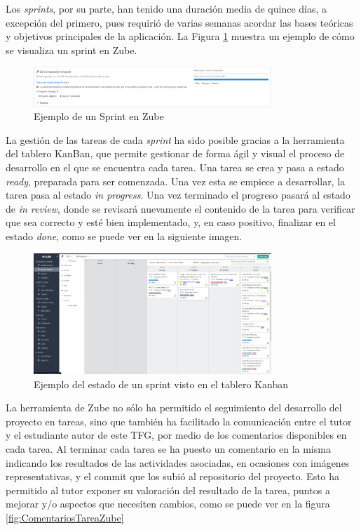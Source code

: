  Los \textit{sprints}, por su parte, han tenido una duración media de quince días, a excepción del primero, pues requirió de varias semanas acordar las bases teóricas y objetivos principales de la aplicación. La Figura \ref{fig:Sprint2} muestra un ejemplo de cómo se visualiza un sprint en Zube.

\begin{figure}[H]
\centering
\includegraphics[width=0.8\textwidth]{img/Sprint2.png}
\caption{Ejemplo de un Sprint en Zube}
\label{fig:Sprint2}
\end{figure}

La gestión de las tareas de cada \textit{sprint} ha sido posible gracias a la herramienta del tablero KanBan, que permite gestionar de forma ágil y visual el proceso de desarrollo en el que se encuentra cada tarea. Una tarea se crea y pasa a estado \textit{ready}, preparada para ser comenzada. Una vez esta se empiece a desarrollar, la tarea pasa al estado \textit{in progress}. Una vez terminado el progreso pasará al estado de \textit{in review}, donde se revisará nuevamente el contenido de la tarea para verificar que sea correcto y esté bien implementado, y, en caso positivo, finalizar en el estado \textit{done}, como se puede ver en la siguiente imagen.

\begin{figure}[H]
\centering
\includegraphics[width=0.8\textwidth]{img/4.1 IteracionZube.png}
\caption{Ejemplo del estado de un sprint visto en el tablero Kanban}
\label{fig:Zube}
\end{figure}

La herramienta de Zube no sólo ha permitido el seguimiento del desarrollo del proyecto en tareas, sino que también ha facilitado la comunicación entre el tutor y el estudiante autor de este TFG, por medio de los comentarios disponibles en cada tarea. Al terminar cada tarea se ha puesto un comentario en la misma indicando los resultados de las actividades asociadas, en ocasiones con imágenes representativas, y el commit que los subió al repositorio del proyecto. Esto ha permitido al tutor exponer su valoración del resultado de la tarea, puntos a mejorar y/o aspectos que necesiten cambios, como se puede ver en la figura \ref{fig:ComentariosTareaZube}

